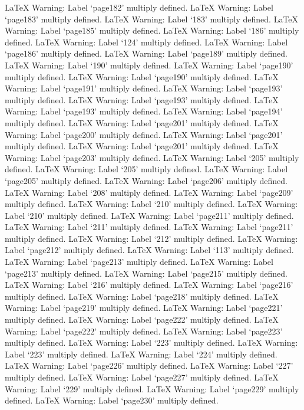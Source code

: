 LaTeX Warning: Label `page182' multiply defined.
LaTeX Warning: Label `page183' multiply defined.
LaTeX Warning: Label `183' multiply defined.
LaTeX Warning: Label `page185' multiply defined.
LaTeX Warning: Label `186' multiply defined.
LaTeX Warning: Label `124' multiply defined.
LaTeX Warning: Label `page186' multiply defined.
LaTeX Warning: Label `page189' multiply defined.
LaTeX Warning: Label `190' multiply defined.
LaTeX Warning: Label `page190' multiply defined.
LaTeX Warning: Label `page190' multiply defined.
LaTeX Warning: Label `page191' multiply defined.
LaTeX Warning: Label `page193' multiply defined.
LaTeX Warning: Label `page193' multiply defined.
LaTeX Warning: Label `page193' multiply defined.
LaTeX Warning: Label `page194' multiply defined.
LaTeX Warning: Label `page201' multiply defined.
LaTeX Warning: Label `page200' multiply defined.
LaTeX Warning: Label `page201' multiply defined.
LaTeX Warning: Label `page201' multiply defined.
LaTeX Warning: Label `page203' multiply defined.
LaTeX Warning: Label `205' multiply defined.
LaTeX Warning: Label `205' multiply defined.
LaTeX Warning: Label `page205' multiply defined.
LaTeX Warning: Label `page206' multiply defined.
LaTeX Warning: Label `208' multiply defined.
LaTeX Warning: Label `page209' multiply defined.
LaTeX Warning: Label `210' multiply defined.
LaTeX Warning: Label `210' multiply defined.
LaTeX Warning: Label `page211' multiply defined.
LaTeX Warning: Label `211' multiply defined.
LaTeX Warning: Label `page211' multiply defined.
LaTeX Warning: Label `212' multiply defined.
LaTeX Warning: Label `page212' multiply defined.
LaTeX Warning: Label `113' multiply defined.
LaTeX Warning: Label `page213' multiply defined.
LaTeX Warning: Label `page213' multiply defined.
LaTeX Warning: Label `page215' multiply defined.
LaTeX Warning: Label `216' multiply defined.
LaTeX Warning: Label `page216' multiply defined.
LaTeX Warning: Label `page218' multiply defined.
LaTeX Warning: Label `page219' multiply defined.
LaTeX Warning: Label `page221' multiply defined.
LaTeX Warning: Label `page222' multiply defined.
LaTeX Warning: Label `page222' multiply defined.
LaTeX Warning: Label `page223' multiply defined.
LaTeX Warning: Label `223' multiply defined.
LaTeX Warning: Label `223' multiply defined.
LaTeX Warning: Label `224' multiply defined.
LaTeX Warning: Label `page226' multiply defined.
LaTeX Warning: Label `227' multiply defined.
LaTeX Warning: Label `page227' multiply defined.
LaTeX Warning: Label `229' multiply defined.
LaTeX Warning: Label `page229' multiply defined.
LaTeX Warning: Label `page230' multiply defined.
